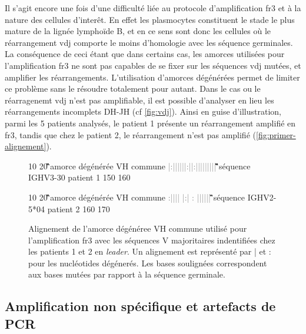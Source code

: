 Il s'agit encore une fois d'une difficulté liée au protocole d'amplification \gls{fr}3 et à la nature des cellules d'interêt. 
En effet les plasmocytes constituent le stade le plus mature de la lignée lymphoïde B, et en ce sens sont donc les cellules où le 
réarrangement \gls{vdj} comporte le moins d'homologie avec les séquence germinales. La conséquence de ceci étant que dans certains 
cas, les amorces utilisées pour l'amplification \gls{fr}3 ne sont pas capables de se fixer sur les séquences \gls{vdj} mutées, et 
amplifier les réarrangements. L'utilisation d'amorces dégénérées permet de limiter ce problème sans le résoudre totalement pour autant. 
Dans le cas ou le réarragenemt \gls{vdj} n'est pas amplifiable, il est possible d'analyser en lieu les réarrangements incomplets DH-JH 
(cf \autoref{fig:vdj}). Ainsi en guise d'illustration, parmi les 5 patients analysés, le patient 1 présente un réarrangement amplifié 
en \gls{fr}3, tandis que chez le patient 2, le réarrangement n'est pas amplifié (\autoref{fig:primer-alignement}).

\begin{figure}[H]
    \centering
    \begin{ColoredVerbatim}
                10         20 
        \G\Hbase\G\G\A\C\A\C\N\G\C\Y\G\T\G\T\A\T\T\A\C amorce dégénérée VH commune
        \textcolor{gray}{|:||||||:||:|||||||||}
        \G\A\G\G\A\C\A\C\G\G\C\T\G\T\G\T\A\T\T\A\C séquence IGHV3-30 patient 1
           150       160

                10        20 
        \G\Hbase\G\G\A\C\A\C\N\G\C\Y\G\T\G\T\A\T\T\A\C amorce dégénérée VH commune
        \textcolor{gray}{ :|||| |:| :   ||||||}
        \A\T\G\G\A\C\Tb\C\A\G\G\C\A\C\Tb\T\A\T\T\A\C séquence IGHV2-5*04 patient 2
              160       170
    \end{ColoredVerbatim}
    \caption{
        Alignement de l'amorce dégénéree VH commune utilisé pour l'amplification \gls{fr}3 
        avec les séquences V majoritaires indentifiées chez les patients 1 et 2 en \textit{leader}. 
        Un alignement est représenté par | et : pour les nucléotides dégénerés. Les bases soulignées 
        correspondent aux bases mutées par rapport à la séquence germinale.
    }
    \label{fig:primer-alignement}
\end{figure}
    
\subsection{Amplification non spécifique et artefacts de PCR}


